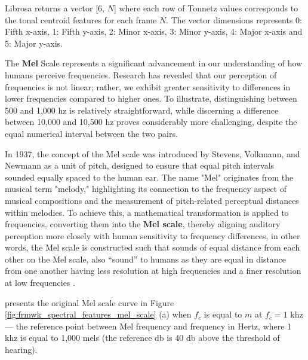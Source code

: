 Librosa returns a vector  [6, $N$] where each row of Tonnetz values corresponds to the tonal centroid features for each frame $N$. The vector dimensions represents 0: Fifth x-axis, 1: Fifth y-axis, 2: Minor x-axis, 3: Minor y-axis, 4: Major x-axis and 5: Major y-axis.


The \textbf{Mel} Scale represents a significant advancement in our understanding of how humans perceive frequencies. Research has revealed that our perception of frequencies is not linear; rather, we exhibit greater sensitivity to differences in lower frequencies compared to higher ones. To illustrate, distinguishing between 500 and 1,000 \gls{hz} is relatively straightforward, while discerning a difference between 10,000 and 10,500 \gls{hz} proves considerably more challenging, despite the equal numerical interval between the two pairs. 

In 1937, the concept of the Mel scale was introduced by Stevens, Volkmann, and Newmann as a unit of pitch, designed to ensure that equal pitch intervals sounded equally spaced to the human ear. The name "Mel" originates from the musical term "melody," highlighting its connection to the frequency aspect of musical compositions and the measurement of pitch-related perceptual distances within melodies. To achieve this, a mathematical transformation is applied to frequencies, converting them into the \textbf{Mel scale}, thereby aligning auditory perception more closely with human sensitivity to frequency differences, in other words, the Mel scale is constructed such that sounds of equal distance from each other on the Mel scale, also “sound” to humans as they are equal in distance from one another having less resolution at high frequencies and a finer resolution at low frequencies \cite{Moore2013}. 

\textcite{Park2008} presents the original Mel scale curve in Figure \ref{fig:frmwk_spectral_features_mel_scale} (a) when $f_c$ is equal to $m$ at $f_c = 1$ \gls{k}\gls{hz} — the reference point between Mel frequency and frequency in Hertz, where 1 \gls{k}\gls{hz} is equal to 1,000 mels (the reference \gls{db} is 40 \gls{db} above the threshold of hearing). 

